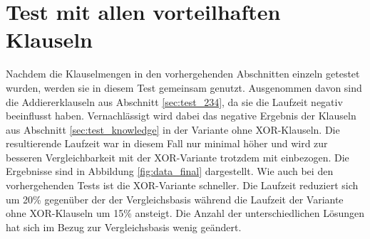 \section{Test mit allen vorteilhaften Klauseln} %
\label{sec:test_beste}

Nachdem die Klauselmengen in den vorhergehenden Abschnitten einzeln getestet wurden, werden sie in diesem Test gemeinsam genutzt.
Ausgenommen davon sind die Addiererklauseln aus Abschnitt \ref{sec:test_234}, da sie die Laufzeit negativ beeinflusst haben.
Vernachlässigt wird dabei das negative Ergebnis der Klauseln aus Abschnitt \ref{sec:test_knowledge} in der Variante ohne XOR-Klauseln.
Die resultierende Laufzeit war in diesem Fall nur minimal höher und wird zur besseren Vergleichbarkeit mit der XOR-Variante trotzdem
mit einbezogen. Die Ergebnisse sind in Abbildung \ref{fig:data_final} dargestellt. Wie auch bei den vorhergehenden Tests ist die XOR-Variante
schneller. Die Laufzeit reduziert sich um 20\% gegenüber der der Vergleichsbasis während die Laufzeit der Variante ohne XOR-Klauseln um
15\% ansteigt. Die Anzahl der unterschiedlichen Lösungen hat sich im Bezug zur Vergleichsbasis wenig geändert.

